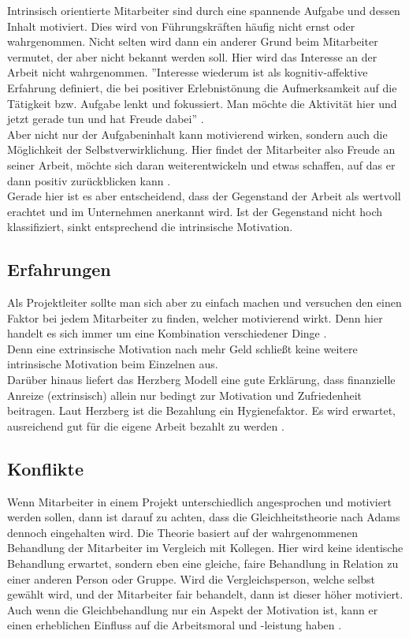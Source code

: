 \documentclass[12pt,a4paper]{scrreprt}
\begin{document}
Intrinsisch orientierte Mitarbeiter sind durch eine spannende Aufgabe und dessen Inhalt motiviert. Dies wird von Führungskräften häufig nicht ernst oder wahrgenommen. Nicht selten wird dann ein anderer Grund beim Mitarbeiter vermutet, der aber nicht bekannt werden soll. Hier wird das Interesse an der Arbeit nicht wahrgenommen. ''Interesse wiederum ist als kognitiv-affektive Erfahrung definiert, die bei positiver Erlebnistönung die Aufmerksamkeit auf die Tätigkeit bzw. Aufgabe lenkt und fokussiert. Man möchte die Aktivität hier und jetzt gerade tun und hat Freude dabei'' \cite{Rheinberg2002}. \\
Aber nicht nur der Aufgabeninhalt kann motivierend wirken, sondern auch die Möglichkeit der Selbstverwirklichung. Hier findet der Mitarbeiter also Freude an seiner Arbeit, möchte sich daran weiterentwickeln und etwas schaffen, auf das er dann positiv zurückblicken kann \cite{Rheinberg2002}.\\
Gerade hier ist es aber entscheidend, dass der Gegenstand der Arbeit als wertvoll erachtet und im Unternehmen anerkannt wird. Ist der Gegenstand nicht hoch klassifiziert, sinkt entsprechend die intrinsische Motivation.

\subsection{Erfahrungen}
Als Projektleiter sollte man sich aber zu einfach machen und versuchen den einen Faktor bei jedem Mitarbeiter zu finden, welcher motivierend wirkt. Denn hier handelt es sich immer um eine Kombination verschiedener Dinge \cite{Heckhausen2006}. \\
Denn eine extrinsische Motivation nach mehr Geld schließt keine weitere intrinsische Motivation beim Einzelnen aus.\\[0,3cm]
Darüber hinaus liefert das Herzberg Modell eine gute Erklärung, dass finanzielle Anreize (extrinsisch) allein nur bedingt zur Motivation und Zufriedenheit beitragen. Laut Herzberg ist die Bezahlung ein Hygienefaktor. Es wird erwartet, ausreichend gut für die eigene Arbeit bezahlt zu werden \cite{Herzberg1959}.

\subsection{Konflikte}
Wenn Mitarbeiter in einem Projekt unterschiedlich angesprochen und motiviert werden sollen, dann ist darauf zu achten, dass die Gleichheitstheorie nach Adams dennoch eingehalten wird. Die Theorie basiert auf der wahrgenommenen Behandlung der Mitarbeiter im Vergleich mit Kollegen. Hier wird keine identische Behandlung erwartet, sondern eben eine gleiche, faire Behandlung in Relation zu einer anderen Person oder Gruppe. Wird die Vergleichsperson, welche selbst gewählt wird, und der Mitarbeiter fair behandelt, dann ist dieser höher motiviert. Auch wenn die Gleichbehandlung nur ein Aspekt der Motivation ist, kann er einen erheblichen Einfluss auf die Arbeitsmoral und -leistung haben \cite{Adams1965}.
\end{document}
